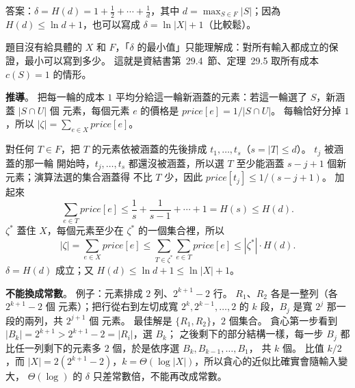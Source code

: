 \begin{pastsoln}
答案：$\delta = H(d) = 1 + \frac12 + \cdots + \frac1d$，其中 $d = \max_{S \in F} |S|$；因為
$H(d) \le \ln d + 1$，也可以寫成 $\delta = \ln |X| + 1$（比較鬆）。

題目沒有給具體的 $X$ 和 $F$，「$\delta$ 的最小值」只能理解成：對所有輸入都成立的保證，最小可以寫到多少。
這就是資結書第~29.4~節、定理~29.5 取所有成本 $c(S) = 1$ 的情形。

\textbf{推導}。 把每一輪的成本 $1$ 平均分給這一輪新涵蓋的元素：若這一輪選了 $S$，新涵蓋 $|S \cap U|$ 個
元素，每個元素 $e$ 的價格是 $\mathit{price}[e] = 1/|S \cap U|$。 每輪恰好分掉 $1$，所以
$|\zeta| = \sum_{e \in X} \mathit{price}[e]$。

對任何 $T \in F$，把 $T$ 的元素依被涵蓋的先後排成 $t_1, \ldots, t_s$（$s = |T| \le d$）。 $t_j$ 被涵蓋的那一輪
開始時，$t_j, \ldots, t_s$ 都還沒被涵蓋，所以選 $T$ 至少能涵蓋 $s - j + 1$ 個新元素；演算法選的集合涵蓋得
不比 $T$ 少，因此 $\mathit{price}[t_j] \le 1/(s - j + 1)$。 加起來
\[
\sum_{e \in T} \mathit{price}[e] \le \frac{1}{s} + \frac{1}{s-1} + \cdots + 1 = H(s) \le H(d).
\]
$\zeta^*$ 蓋住 $X$，每個元素至少在 $\zeta^*$ 的一個集合裡，所以
\[
|\zeta| = \sum_{e \in X} \mathit{price}[e] \le \sum_{T \in \zeta^*} \sum_{e \in T} \mathit{price}[e]
\le |\zeta^*| \cdot H(d).
\]
$\delta = H(d)$ 成立；又 $H(d) \le \ln d + 1 \le \ln |X| + 1$。

\textbf{不能換成常數}。 例子：元素排成 $2$ 列、$2^{k+1} - 2$ 行。 $R_1$、$R_2$ 各是一整列（各 $2^{k+1} - 2$ 個
元素）；把行從右到左切成寬 $2^k, 2^{k-1}, \ldots, 2$ 的 $k$ 段，$B_j$ 是寬 $2^j$ 那一段的兩列，共 $2^{j+1}$ 個
元素。 最佳解是 $\{R_1, R_2\}$，$2$ 個集合。 貪心第一步看到 $|B_k| = 2^{k+1} > 2^{k+1} - 2 = |R_i|$，選 $B_k$；
之後剩下的部分結構一樣，每一步 $B_j$ 都比任一列剩下的元素多 $2$ 個，於是依序選 $B_k, B_{k-1}, \ldots, B_1$，
共 $k$ 個。 比值 $k/2$，而 $|X| = 2(2^{k+1} - 2)$，$k = \Theta(\log |X|)$，所以貪心的近似比確實會隨輸入變大，
$\Theta(\log)$ 的 $\delta$ 只差常數倍，不能再改成常數。
\end{pastsoln}
